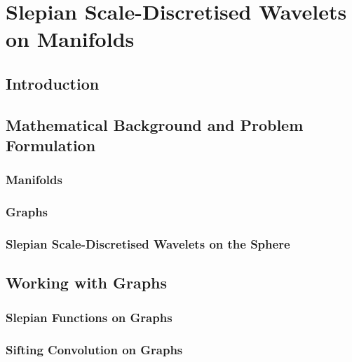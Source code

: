 \chapter{Slepian Scale-Discretised Wavelets on Manifolds}\label{sec:chapter4}

\section{Introduction}

\section{Mathematical Background and Problem Formulation}

\subsection{Manifolds}



\subsection{Graphs}



\subsection{Slepian Scale-Discretised Wavelets on the Sphere}

\section{Working with Graphs}

\subsection{Slepian Functions on Graphs}







\subsection{Sifting Convolution on Graphs}

